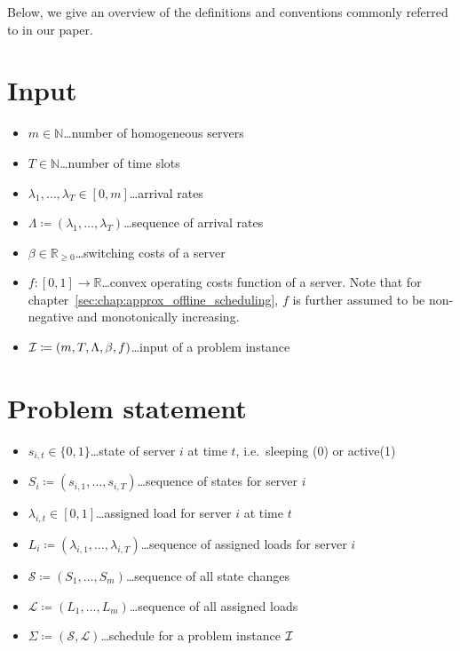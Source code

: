 
Below, we give an overview of the definitions and conventions commonly referred to in our paper.
\section*{Input}
\begin{itemize}
	\item $m\in\mathbb{N}$\ldots number of homogeneous servers
	\item $T\in\mathbb{N}$\ldots number of time slots
	\item $\lambda_1,\ldots,\lambda_{T}\in[0,m]$\ldots arrival rates
	\item $\Lambda\coloneqq(\lambda_1,\ldots,\lambda_T)$\ldots sequence of arrival rates
	\item $\beta\in\mathbb{R}_{\ge 0}$\ldots switching costs of a server
	\item $f:[0,1]\rightarrow\mathbb{R}$\ldots convex operating costs function of a server. Note that for chapter~\ref{sec:chap:approx_offline_scheduling}, $f$ is further assumed to be non-negative and monotonically increasing.	
	\item $\mathcal{I}\coloneqq(m,T,\Lambda,\beta,f)$\ldots input of a problem instance
\end{itemize}

\section*{Problem statement}
\begin{itemize}
	\item $s_{i,t}\in\{0,1\}$\ldots state of server $i$ at time $t$, i.e.\ sleeping (0) or active(1)
	\item $S_i\coloneqq(s_{i,1},\ldots,s_{i,T})$\ldots sequence of states for server $i$
	\item $\lambda_{i,t}\in[0,1]$\ldots assigned load for server $i$ at time $t$
	\item $L_i\coloneqq(\lambda_{i,1},\ldots,\lambda_{i,T})$\ldots sequence of assigned loads for server $i$
	\item $\mathcal{S}\coloneqq(S_1,\ldots,S_m)$\ldots sequence of all state changes
	\item $\mathcal{L}\coloneqq(L_1,\ldots,L_m)$\ldots sequence of all assigned loads
	\item $\Sigma\coloneqq(\mathcal{S},\mathcal{L})$\ldots schedule for a problem instance $\mathcal{I}$
\end{itemize}

